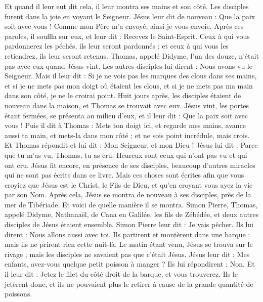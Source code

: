 \begin{multicols}{2}
Et quand il leur eut dit cela, il leur montra ses mains et son côté. Les disciples furent dans la joie en voyant le Seigneur.
Jésus leur dit de nouveau : Que la paix soit avec vous ! Comme mon Père m'a envoyé, ainsi je vous envoie.
Après ces paroles, il souffla sur eux, et leur dit : Recevez le Saint-Esprit.
Ceux à qui vous pardonnerez les péchés, ils leur seront pardonnés ; et ceux à qui vous les retiendrez, ils leur seront retenus.
Thomas, appelé Didyme, l'un des douze, n'était pas avec eux quand Jésus vint.
Les autres disciples lui dirent : Nous avons vu le Seigneur. Mais il leur dit : Si je ne vois pas les marques des clous dans ses mains, et si je ne mets pas mon doigt où étaient les clous, et si je ne mets pas ma main dans son côté, je ne le croirai point.
Huit jours après, les disciples étaient de nouveau dans la maison, et Thomas se trouvait avec eux. Jésus vint, les portes étant fermées, se présenta au milieu d'eux, et il leur dit : Que la paix soit avec vous !
Puis il dit à Thomas : Mets ton doigt ici, et regarde mes mains, avance aussi ta main, et mets-la dans mon côté ; et ne sois point incrédule, mais crois.
Et Thomas répondit et lui dit : Mon Seigneur, et mon Dieu !
Jésus lui dit : Parce que tu m'as vu, Thomas, tu as cru. Heureux sont ceux qui n'ont pas vu et qui ont cru.
Jésus fit encore, en présence de ses disciples, beaucoup d'autres miracles qui ne sont pas écrits dans ce livre.
Mais ces choses sont écrites afin que vous croyiez que Jésus est le Christ, le Fils de Dieu, et qu'en croyant vous ayez la vie par son Nom.
\VerseOne{}Après cela, Jésus se montra de nouveau à ses disciples, près de la mer de Tibériade. Et voici de quelle manière il se montra.
Simon Pierre, Thomas, appelé Didyme, Nathanaël, de Cana en Galilée, les fils de Zébédée, et deux autres disciples de Jésus étaient ensemble.
Simon Pierre leur dit : Je vais pêcher. Ils lui dirent : Nous allons aussi avec toi. Ils partirent et montèrent dans une barque ; mais ils ne prirent rien cette nuit-là.
Le matin étant venu, Jésus se trouva sur le rivage ; mais les disciples ne savaient pas que c'était Jésus.
Jésus leur dit : Mes enfants, avez-vous quelque petit poisson à manger ? Ils lui répondirent : Non.
Et il leur dit : Jetez le filet du côté droit de la barque, et vous trouverez. Ils le jetèrent donc, et ils ne pouvaient plus le retirer à cause de la grande quantité de poissons.

\end{multicols}
